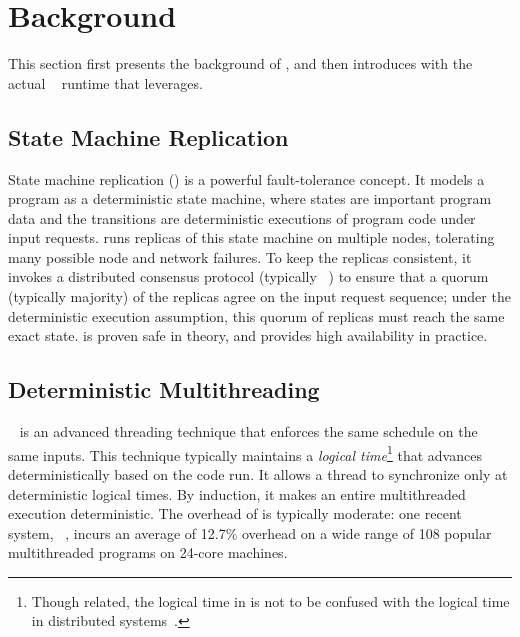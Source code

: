 \section{Background} \label{sec:background}

This section first presents the background of \smr, and then introduces \dmt 
with the actual \parrot~\cite{parrot:sosp13} runtime that \xxx leverages.

\subsection{State Machine Replication} \label{sec:smr}

State machine replication (\smr) is a powerful fault-tolerance
concept.  It models a program as a deterministic state machine, where
states are important program data and the transitions are deterministic
executions of program code under input requests.  \smr runs replicas of
this state machine on multiple nodes, tolerating many possible node and
network failures.  To keep the replicas consistent, it invokes a
distributed consensus protocol (typically \paxos~\cite{paxos}) to ensure
that a quorum (typically majority) of the replicas agree on the input
request sequence; under the deterministic execution assumption, this
quorum of replicas must reach the same exact state.  \smr is proven safe
in theory, and provides high availability in practice.

\subsection{Deterministic Multithreading} \label{sec:dmt}

\dmt~\cite{dpj:oopsla09, 
dmp:asplos09, kendo:asplos09, coredet:asplos10, dos:osdi10, ddos:asplos13, 
ics:oopsla13} is an advanced threading technique that enforces the same 
schedule 
on the same inputs.  This technique typically maintains a \emph{logical
  time}\footnote{Though related, the logical time in \dmt is not to be
  confused with the logical time in distributed
  systems~\cite{lamportclock}.} that advances deterministically based on
the code run.  It allows a thread to synchronize only at deterministic
logical times.  By induction, it makes an entire multithreaded execution
deterministic.  The overhead of \dmt is typically moderate: one recent
\dmt system, \parrot~\cite{parrot:sosp13}, incurs an average of 12.7\%
overhead on a wide range of 108 popular multithreaded programs on 24-core
machines.

